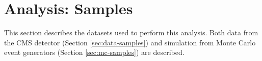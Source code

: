 \chapter{Analysis: Samples}
\label{ch:analysis-samples}

This section describes the datasets used to perform
this analysis.  Both data from the CMS detector (Section \ref{sec:data-samples})
and simulation from Monte Carlo event generators (Section \ref{sec:mc-samples}) 
are described.
